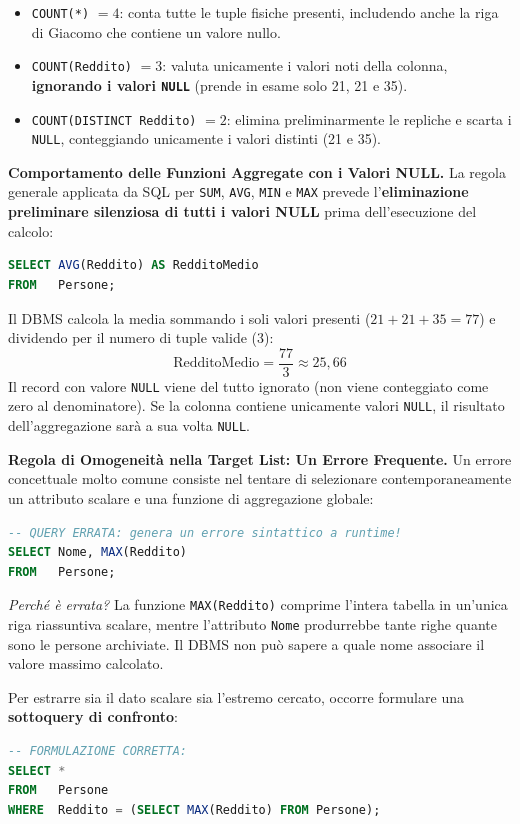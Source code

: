 \documentclass[12pt]{extarticle}
\begin{document}
\begin{itemize}
    \item \texttt{COUNT(*)} $= 4$: conta tutte le tuple fisiche presenti, includendo anche la riga di Giacomo che contiene un valore nullo.
    \item \texttt{COUNT(Reddito)} $= 3$: valuta unicamente i valori noti della colonna, \textbf{ignorando i valori \texttt{NULL}} (prende in esame solo 21, 21 e 35).
    \item \texttt{COUNT(DISTINCT Reddito)} $= 2$: elimina preliminarmente le repliche e scarta i \texttt{NULL}, conteggiando unicamente i valori distinti (21 e 35).
\end{itemize}

\medskip
\noindent \textbf{Comportamento delle Funzioni Aggregate con i Valori NULL.} La regola generale applicata da SQL per \texttt{SUM}, \texttt{AVG}, \texttt{MIN} e \texttt{MAX} prevede l'\textbf{eliminazione preliminare silenziosa di tutti i valori NULL} prima dell'esecuzione del calcolo:

\begin{lstlisting}[language=SQL]
SELECT AVG(Reddito) AS RedditoMedio
FROM   Persone;
\end{lstlisting}
Il DBMS calcola la media sommando i soli valori presenti ($21 + 21 + 35 = 77$) e dividendo per il numero di tuple valide ($3$):
\[
\text{RedditoMedio} = \frac{77}{3} \approx 25{,}66
\]
Il record con valore \texttt{NULL} viene del tutto ignorato (non viene conteggiato come zero al denominatore). Se la colonna contiene unicamente valori \texttt{NULL}, il risultato dell'aggregazione sarà a sua volta \texttt{NULL}.

\medskip
\noindent \textbf{Regola di Omogeneità nella Target List: Un Errore Frequente.} Un errore concettuale molto comune consiste nel tentare di selezionare contemporaneamente un attributo scalare e una funzione di aggregazione globale:

\begin{lstlisting}[language=SQL]
-- QUERY ERRATA: genera un errore sintattico a runtime!
SELECT Nome, MAX(Reddito)
FROM   Persone;
\end{lstlisting}
\textit{Perché è errata?} La funzione \texttt{MAX(Reddito)} comprime l'intera tabella in un'unica riga riassuntiva scalare, mentre l'attributo \texttt{Nome} produrrebbe tante righe quante sono le persone archiviate. Il DBMS non può sapere a quale nome associare il valore massimo calcolato.

\medskip
\noindent Per estrarre sia il dato scalare sia l'estremo cercato, occorre formulare una \textbf{sottoquery di confronto}:
\begin{lstlisting}[language=SQL]
-- FORMULAZIONE CORRETTA:
SELECT *
FROM   Persone
WHERE  Reddito = (SELECT MAX(Reddito) FROM Persone);
\end{lstlisting}
\end{document}
